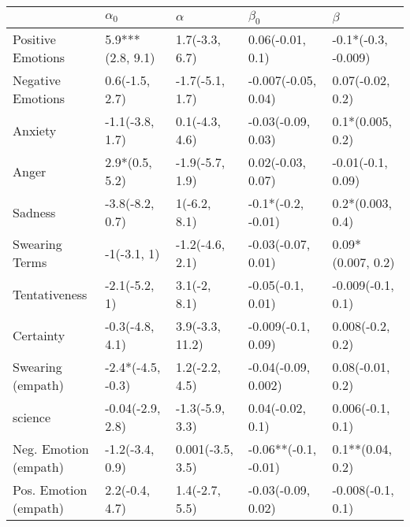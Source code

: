 \begin{tabular}{lllll}
\toprule
{} &         $\alpha_0$ &          $\alpha$ &             $\beta_0$ &              $\beta$ \\
\midrule
Positive Emotions     &   5.9***(2.8, 9.1) &    1.7(-3.3, 6.7) &      0.06(-0.01, 0.1) &  -0.1*(-0.3, -0.009) \\
Negative Emotions     &     0.6(-1.5, 2.7) &   -1.7(-5.1, 1.7) &   -0.007(-0.05, 0.04) &     0.07(-0.02, 0.2) \\
Anxiety               &    -1.1(-3.8, 1.7) &    0.1(-4.3, 4.6) &    -0.03(-0.09, 0.03) &     0.1*(0.005, 0.2) \\
Anger                 &     2.9*(0.5, 5.2) &   -1.9(-5.7, 1.9) &     0.02(-0.03, 0.07) &    -0.01(-0.1, 0.09) \\
Sadness               &    -3.8(-8.2, 0.7) &      1(-6.2, 8.1) &    -0.1*(-0.2, -0.01) &     0.2*(0.003, 0.4) \\
Swearing Terms        &        -1(-3.1, 1) &   -1.2(-4.6, 2.1) &    -0.03(-0.07, 0.01) &    0.09*(0.007, 0.2) \\
Tentativeness         &      -2.1(-5.2, 1) &      3.1(-2, 8.1) &     -0.05(-0.1, 0.01) &    -0.009(-0.1, 0.1) \\
Certainty             &    -0.3(-4.8, 4.1) &   3.9(-3.3, 11.2) &    -0.009(-0.1, 0.09) &     0.008(-0.2, 0.2) \\
Swearing (empath)     &  -2.4*(-4.5, -0.3) &    1.2(-2.2, 4.5) &   -0.04(-0.09, 0.002) &     0.08(-0.01, 0.2) \\
science               &   -0.04(-2.9, 2.8) &   -1.3(-5.9, 3.3) &      0.04(-0.02, 0.1) &     0.006(-0.1, 0.1) \\
Neg. Emotion (empath) &    -1.2(-3.4, 0.9) &  0.001(-3.5, 3.5) &  -0.06**(-0.1, -0.01) &     0.1**(0.04, 0.2) \\
Pos. Emotion (empath) &     2.2(-0.4, 4.7) &    1.4(-2.7, 5.5) &    -0.03(-0.09, 0.02) &    -0.008(-0.1, 0.1) \\
\bottomrule
\end{tabular}

